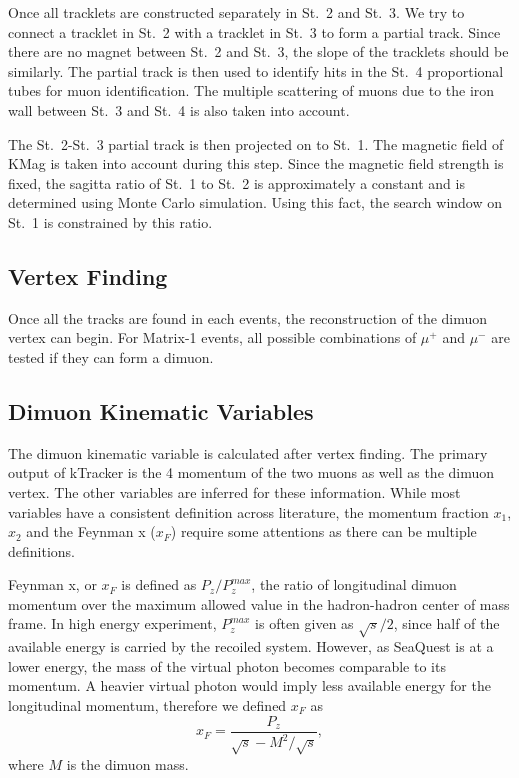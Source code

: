 \documentclass[../main.tex]{subfiles}
\begin{document}
Once all tracklets are constructed separately in St.~2 and St.~3. We try to connect a tracklet
in St.~2 with a tracklet in St.~3 to form a partial track. Since there are no magnet between
St.~2 and St.~3, the slope of the tracklets should be similarly. The partial track is then used to
identify hits in the St.~4 proportional tubes for muon identification. The multiple scattering of
muons due to the iron wall between St.~3 and St.~4 is also taken into account.

The St.~2-St.~3 partial track is then projected on to St.~1. The magnetic field of KMag is taken into
account during this step. Since the magnetic field strength is fixed, the sagitta ratio of St.~1 to
St.~2 is approximately a constant and is determined using Monte Carlo simulation. Using this fact,
the search window on St.~1 is constrained by this ratio.


\subsection{Vertex Finding}
Once all the tracks are found in each events, the reconstruction of the dimuon vertex can begin.
For Matrix-1 events, all possible combinations of $\mu^+$ and $\mu^-$ are tested if they can form
a dimuon.


\subsection{Dimuon Kinematic Variables}
\label{subsec:def_kinematic}
The dimuon kinematic variable is calculated after vertex finding. The primary output of kTracker
is the 4 momentum of the two muons as well as the dimuon vertex. The other variables are inferred 
for these information. While most variables have a consistent definition across literature, the momentum
fraction $x_1$, $x_2$ and the Feynman x ($x_F$) require some attentions as there can be multiple definitions.

Feynman x, or $x_F$ is defined as $P_z/P_z^{max}$, the ratio of longitudinal dimuon momentum
over the maximum allowed value in the hadron-hadron center of mass frame. In high energy
experiment, $P_z^{max}$ is often given as $\sqrt{s}/2$, since half of the available energy is
carried by the recoiled system.
However, as SeaQuest is at a lower energy, the mass of the virtual photon becomes comparable to its momentum.
A heavier virtual photon would imply less available energy for the longitudinal momentum,
therefore we defined $x_F$ as 
\begin{equation}
	x_F = \frac{P_z}{\sqrt{s}-M^2/\sqrt{s}},
\end{equation}
where $M$ is the dimuon mass.
\end{document}
